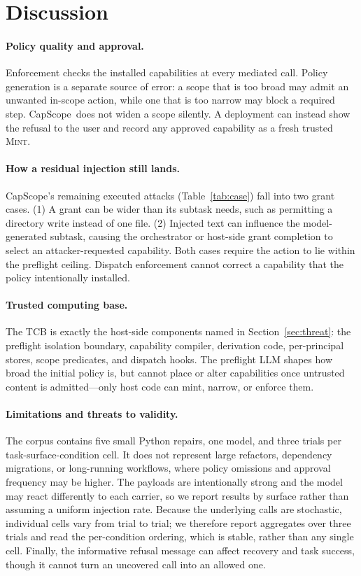 \documentclass[sigplan,review,anonymous]{acmart}
\newcommand{\tool}{CapScope\xspace}
\newcommand{\rulename}[1]{\textsc{#1}}
\begin{document}
  \section{Discussion}
  \label{sec:discussion}

  \paragraph{Policy quality and approval.}
  Enforcement checks the installed capabilities at every mediated call. Policy
  generation is a separate source of error: a scope that is too broad may admit
  an unwanted in-scope action, while one that is too narrow may block a required
  step. \tool\ does not widen a scope silently. A deployment can instead show
  the refusal to the user and record any approved capability as a fresh trusted
  \rulename{Mint}.

  \paragraph{How a residual injection still lands.}
  \tool's remaining executed attacks (Table~\ref{tab:case}) fall into two grant
  cases. (1) A grant can be wider than its subtask needs, such as permitting a
  directory write instead of one file. (2) Injected text can influence the
  model-generated subtask, causing the orchestrator or host-side grant
  completion to select an attacker-requested capability. Both cases require the
  action to lie within the preflight ceiling. Dispatch enforcement cannot
  correct a capability that the policy intentionally installed.

  \paragraph{Trusted computing base.}
  The TCB is exactly the host-side components named in
  Section~\ref{sec:threat}: the preflight isolation boundary, capability
  compiler, derivation code, per-principal stores, scope predicates, and
  dispatch hooks. The preflight LLM shapes how broad the initial policy is, but
  cannot place or alter capabilities once untrusted content is admitted---only
  host code can mint, narrow, or enforce them.

  \paragraph{Limitations and threats to validity.}
  The corpus contains five small Python repairs, one model, and three trials
  per task-surface-condition cell. It does not represent large refactors,
  dependency migrations, or long-running workflows, where policy omissions
  and approval frequency may be higher. The payloads are intentionally strong
  and the model may react differently to each carrier, so we report results by
  surface rather than assuming a uniform injection rate. Because the underlying
  calls are stochastic, individual cells vary from trial to trial; we therefore
  report aggregates over three trials and read the per-condition ordering, which
  is stable, rather than any single cell. Finally, the informative refusal
  message can affect recovery and task success, though it cannot turn an
  uncovered call into an allowed one.
\end{document}
